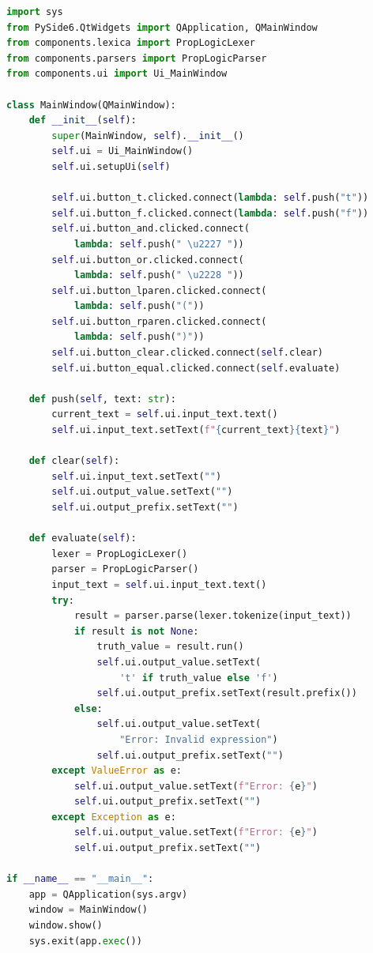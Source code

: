 \begin{lstlisting}[language=Python]
import sys
from PySide6.QtWidgets import QApplication, QMainWindow
from components.lexica import PropLogicLexer
from components.parsers import PropLogicParser
from components.ui import Ui_MainWindow

class MainWindow(QMainWindow):
    def __init__(self):
        super(MainWindow, self).__init__()
        self.ui = Ui_MainWindow()
        self.ui.setupUi(self)

        self.ui.button_t.clicked.connect(lambda: self.push("t"))
        self.ui.button_f.clicked.connect(lambda: self.push("f"))
        self.ui.button_and.clicked.connect(
            lambda: self.push(" \u2227 "))
        self.ui.button_or.clicked.connect(
            lambda: self.push(" \u2228 "))
        self.ui.button_lparen.clicked.connect(
            lambda: self.push("("))
        self.ui.button_rparen.clicked.connect(
            lambda: self.push(")"))
        self.ui.button_clear.clicked.connect(self.clear)
        self.ui.button_equal.clicked.connect(self.evaluate)

    def push(self, text: str):
        current_text = self.ui.input_text.text()
        self.ui.input_text.setText(f"{current_text}{text}")

    def clear(self):
        self.ui.input_text.setText("")
        self.ui.output_value.setText("")
        self.ui.output_prefix.setText("")

    def evaluate(self):
        lexer = PropLogicLexer()
        parser = PropLogicParser()
        input_text = self.ui.input_text.text()
        try:
            result = parser.parse(lexer.tokenize(input_text))
            if result is not None:
                truth_value = result.run()
                self.ui.output_value.setText(
                    't' if truth_value else 'f')
                self.ui.output_prefix.setText(result.prefix())
            else:
                self.ui.output_value.setText(
                    "Error: Invalid expression")
                self.ui.output_prefix.setText("")
        except ValueError as e:
            self.ui.output_value.setText(f"Error: {e}")
            self.ui.output_prefix.setText("")
        except Exception as e:
            self.ui.output_value.setText(f"Error: {e}")
            self.ui.output_prefix.setText("")

if __name__ == "__main__":
    app = QApplication(sys.argv)
    window = MainWindow()
    window.show()
    sys.exit(app.exec())
\end{lstlisting}
